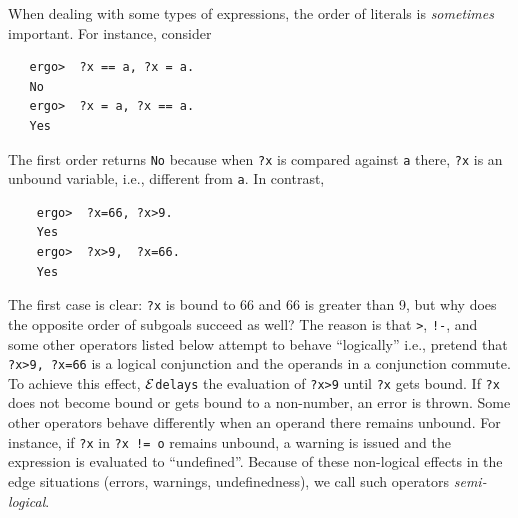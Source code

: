 \documentclass[11pt]{article}
\newcommand{\ERGO}{\mbox{\ensuremath{\cal{E}}\smaller{{\sc{RGO}}}}\xspace}
\newcommand{\FLSYSTEM}{\ERGO}
\begin{document}
When dealing with some types of expressions, the order of literals is
\emph{sometimes} important.
For instance, consider
\begin{verbatim}
   ergo>  ?x == a, ?x = a.
   No
   ergo>  ?x = a, ?x == a.
   Yes
\end{verbatim}
The first order returns \texttt{No}  because when \texttt{?x} is compared against
\texttt{a} there, \texttt{?x} is an unbound variable, i.e., different from
\texttt{a}.     
In contrast,
\begin{verbatim}
    ergo>  ?x=66, ?x>9.
    Yes
    ergo>  ?x>9,  ?x=66.
    Yes
\end{verbatim}
The first case is clear: \texttt{?x} is bound to 66 and 66 is greater than
9, but why does the opposite order of subgoals succeed as well? The reason
is that  \texttt{>}, \texttt{!-}, and some other operators listed below
attempt to behave ``logically'' i.e., pretend that \texttt{?x>9,  ?x=66} is
a logical conjunction and the operands in a conjunction commute. To achieve
this effect, \FLSYSTEM \texttt{delays}   the evaluation of \texttt{?x>9} until
\texttt{?x}  gets bound. If \texttt{?x} does not become bound or gets bound
to a non-number, an error is thrown.
Some other operators behave differently when 
an operand there remains unbound. For instance, if \texttt{?x} in
\texttt{?x != o} remains unbound, a warning is issued and the expression is
evaluated to ``undefined''.
Because of these non-logical effects in the edge situations (errors,
warnings, undefinedness), we call such operators \emph{semi-logical}. 
\label{pg-semi-logical}
  
\end{document}
